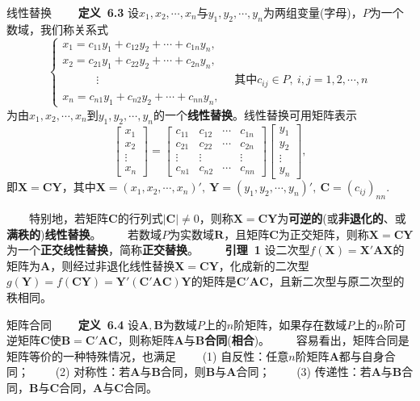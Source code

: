 \documentclass[compress,mathserif,cjk]{beamer}
\theoremstyle{remark}
\numberwithin{equation}{section}
\newcommand{\hei}{\bf}      %
\begin{document}
\begin{CJK}{UTF8}{gbsn}
\begin{frame}{线性替换}\small
 \ \ \ \ {\hei 定义~6.3} 设$x_1,x_2,\cdots,x_n$与$y_1,y_2,\cdots,y_n$为两组变量(字母)，$P$为一个数域，我们称关系式
 $$\left\{\begin{array}{l}
 x_1=c_{11}y_1+c_{12}y_2+\cdots+c_{1n}y_n,\\
 x_2=c_{21}y_1+c_{22}y_2+\cdots+c_{2n}y_n,\\
 \hspace{3em}\vdots\hspace{12em}\mbox{其中}c_{ij}\in P,~i,j=1,2,\cdots,n\\
 x_n=c_{n1}y_1+c_{n2}y_2+\cdots+c_{nn}y_n,
 \end{array}\right.$$
 为由$x_1,x_2,\cdots,x_n$到$y_1,y_2,\cdots,y_n$的一个{\hei 线性替换}。\pause 线性替换可用矩阵表示
 $$\left[\begin{matrix}x_1\\x_2\\\vdots\\x_n\end{matrix}\right]
 =\left[\begin{matrix}c_{11}&c_{12}&\cdots&c_{1n}\\c_{21}&c_{22}&\cdots&c_{2n}\\\vdots&\vdots&&\vdots\\c_{n1}&c_{n2}&\cdots&c_{nn}\end{matrix}\right]
 \left[\begin{matrix}y_1\\y_2\\\vdots\\y_n\end{matrix}\right],$$
 即$\bm X=\bm{CY}$，其中$\bm X=(x_1,x_2,\cdots,x_n)',~\bm Y=(y_1,y_2,\cdots,y_n)',~\bm C=(c_{ij})_{nn}$.
\end{frame}

\begin{frame}
\ \ \ \ 特别地，若矩阵$\bm C$的行列式$|\bm C|\neq0$，则称$\bm X=\bm{CY}$为{\hei 可逆的}(或{\hei 非退化的}、或{\hei 满秩的}){\hei 线性替换}。
\vskip 5pt
\ \ \ \ 若数域$P$为实数域$\mathbf R$，且矩阵$\bm C$为正交矩阵，则称$\bm X=\bm{CY}$为一个{\hei 正交线性替换}，简称{\hei 正交替换}。
\pause\vskip 10pt
\ \ \ \ {\hei 引理~1} 设二次型$f(\bm X)=\bm X'\bm{AX}$的矩阵为$\bm A$，则经过非退化线性替换$\bm X=\bm{CY}$，化成新的二次型$g(\bm Y)=f(\bm{CY})=\bm Y'(\bm C'\bm{AC})\bm Y$的矩阵是$\bm C'\bm{AC}$，且新二次型与原二次型的秩相同。
\end{frame}

\begin{frame}{矩阵合同}
\ \ \ \ {\hei 定义~6.4} 设$\bm A,\bm B$为数域$P$上的$n$阶矩阵，如果存在数域$P$上的$n$阶可逆矩阵$\bm C$使$\bm B=\bm C'\bm{AC}$，则称矩阵$\bm A$与$\bm B${\hei 合同}({\hei 相合})。
\vskip 5pt
\ \ \ \ 容易看出，矩阵合同是矩阵等价的一种特殊情况，也满足
\vskip 5pt
\ \ \ \ (1) 自反性：任意$n$阶矩阵$\bm A$都与自身合同；
\vskip 5pt
\ \ \ \ (2) 对称性：若$\bm A$与$\bm B$合同，则$\bm B$与$\bm A$合同；
\vskip 5pt
\ \ \ \ (3) 传递性：若$\bm A$与$\bm B$合同，$\bm B$与$\bm C$合同，$\bm A$与$\bm C$合同。
\end{frame}



\end{CJK}
\end{document}
